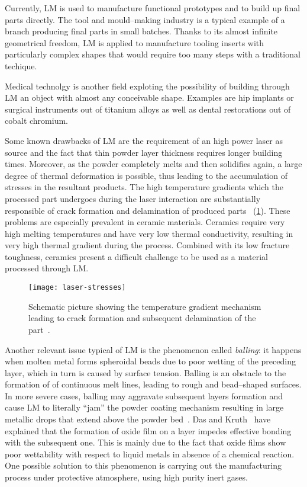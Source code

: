 Currently, LM is used to manufacture functional prototypes and to build up final parts directly. The tool and mould--making industry is a typical example of a branch producing final parts in small batches. Thanks to its almost infinite geometrical freedom, LM is applied to manufacture tooling inserts with particularly complex shapes that would require too many steps with a traditional techique.

Medical technolgy is another field exploting the possibility of building through LM an object with almost any conceivable shape. Examples are hip implants or surgical instruments out of titanium alloys as well as dental restorations out of cobalt chromium.

Some known drawbacks of LM are the requirement of an high power laser as source and the fact that thin powder layer thickness requires longer building times. Moreover, as the powder completely melts and then solidifies again, a large degree of thermal deformation is possible, thus leading to the accumulation of stresses in the resultant products.
The high temperature gradients which the processed part undergoes during the laser interaction are substantially responsible of crack formation and delamination of produced parts~\cite{Kempen2013} (\cref{fig:stress-formation}).
These problems are especially prevalent in ceramic materials. Ceramics require very high melting temperatures and have very low thermal conductivity, resulting in very high thermal gradient during the process. Combined with its low fracture toughness, ceramics present a difficult challenge to be used as a material processed through LM.
\begin{figure}[tb]
    \centering
    \texttt{[image: laser-stresses]}
    \caption{Schematic picture showing the temperature gradient mechanism leading to crack formation and subsequent delamination of the part~\cite{Kempen2013}.}
    \label{fig:stress-formation}
\end{figure}


Another relevant issue typical of LM is the phenomenon called \textit{balling}: it happens when molten metal forms spheroidal beads due to poor wetting of the preceding layer, which in turn is caused by surface tension. Balling is an obstacle to the formation of of continuous melt lines, leading to rough and bead--shaped surfaces. In more severe cases, balling may aggravate subsequent layers formation and cause LM to literally ``jam'' the powder coating mechanism resulting in large metallic drops that extend above the powder bed~\cite{Yap2015}.
Das and Kruth~\cite{Das2003} have explained that the formation of oxide film on a layer impedes effective bonding with the subsequent one. This is mainly due to the fact that oxide films show poor wettability with respect to liquid metals in absence of a chemical reaction.
One possible solution to this phenomenon is carrying out the manufacturing process under protective atmosphere, using high purity inert gases.




